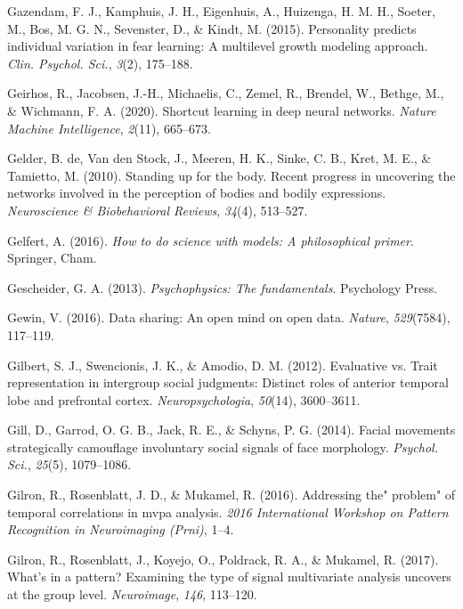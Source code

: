 \documentclass[11pt,american,]{memoir} %
\begin{document}
\leavevmode\hypertarget{ref-Gazendam2015-fr}{}%
Gazendam, F. J., Kamphuis, J. H., Eigenhuis, A., Huizenga, H. M. H., Soeter, M., Bos, M. G. N., Sevenster, D., \& Kindt, M. (2015). Personality predicts individual variation in fear learning: A multilevel growth modeling approach. \emph{Clin. Psychol. Sci.}, \emph{3}(2), 175--188.

\leavevmode\hypertarget{ref-Geirhos2020-af}{}%
Geirhos, R., Jacobsen, J.-H., Michaelis, C., Zemel, R., Brendel, W., Bethge, M., \& Wichmann, F. A. (2020). Shortcut learning in deep neural networks. \emph{Nature Machine Intelligence}, \emph{2}(11), 665--673.

\leavevmode\hypertarget{ref-de2010standing}{}%
Gelder, B. de, Van den Stock, J., Meeren, H. K., Sinke, C. B., Kret, M. E., \& Tamietto, M. (2010). Standing up for the body. Recent progress in uncovering the networks involved in the perception of bodies and bodily expressions. \emph{Neuroscience \& Biobehavioral Reviews}, \emph{34}(4), 513--527.

\leavevmode\hypertarget{ref-Gelfert2016-hd}{}%
Gelfert, A. (2016). \emph{How to do science with models: A philosophical primer}. Springer, Cham.

\leavevmode\hypertarget{ref-Gescheider2013-zm}{}%
Gescheider, G. A. (2013). \emph{Psychophysics: The fundamentals}. Psychology Press.

\leavevmode\hypertarget{ref-Gewin2016-ff}{}%
Gewin, V. (2016). Data sharing: An open mind on open data. \emph{Nature}, \emph{529}(7584), 117--119.

\leavevmode\hypertarget{ref-gilbert2012evaluative}{}%
Gilbert, S. J., Swencionis, J. K., \& Amodio, D. M. (2012). Evaluative vs. Trait representation in intergroup social judgments: Distinct roles of anterior temporal lobe and prefrontal cortex. \emph{Neuropsychologia}, \emph{50}(14), 3600--3611.

\leavevmode\hypertarget{ref-Gill2014-hx}{}%
Gill, D., Garrod, O. G. B., Jack, R. E., \& Schyns, P. G. (2014). Facial movements strategically camouflage involuntary social signals of face morphology. \emph{Psychol. Sci.}, \emph{25}(5), 1079--1086.

\leavevmode\hypertarget{ref-gilron2016addressing}{}%
Gilron, R., Rosenblatt, J. D., \& Mukamel, R. (2016). Addressing the" problem" of temporal correlations in mvpa analysis. \emph{2016 International Workshop on Pattern Recognition in Neuroimaging (Prni)}, 1--4.

\leavevmode\hypertarget{ref-Gilron2017-tl}{}%
Gilron, R., Rosenblatt, J., Koyejo, O., Poldrack, R. A., \& Mukamel, R. (2017). What's in a pattern? Examining the type of signal multivariate analysis uncovers at the group level. \emph{Neuroimage}, \emph{146}, 113--120.
\end{document}
